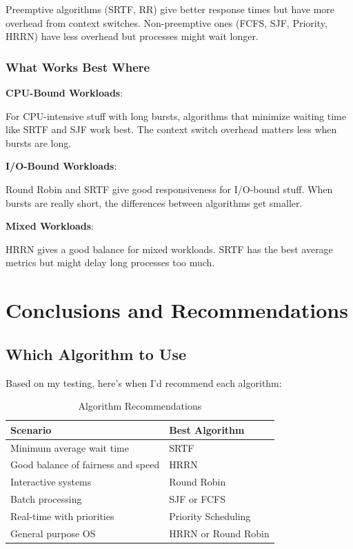\documentclass[12pt,letterpaper]{article}
\begin{document}
Preemptive algorithms (SRTF, RR) give better response times but have more 
overhead from context switches. Non-preemptive ones (FCFS, SJF, Priority, HRRN) 
have less overhead but processes might wait longer.

\subsubsection{What Works Best Where}

\textbf{CPU-Bound Workloads}:

For CPU-intensive stuff with long bursts, algorithms that minimize waiting time 
like SRTF and SJF work best. The context switch overhead matters less when 
bursts are long.

\textbf{I/O-Bound Workloads}:

Round Robin and SRTF give good responsiveness for I/O-bound stuff. When bursts 
are really short, the differences between algorithms get smaller.

\textbf{Mixed Workloads}:

HRRN gives a good balance for mixed workloads. SRTF has the best average metrics 
but might delay long processes too much.

\newpage

\section{Conclusions and Recommendations}

\subsection{Which Algorithm to Use}

Based on my testing, here's when I'd recommend each algorithm:

\begin{table}[H]
\centering
\caption{Algorithm Recommendations}
\begin{tabular}{@{}ll@{}}
\toprule
\textbf{Scenario} & \textbf{Best Algorithm} \\ \midrule
Minimum average wait time & SRTF \\
Good balance of fairness and speed & HRRN \\
Interactive systems & Round Robin \\
Batch processing & SJF or FCFS \\
Real-time with priorities & Priority Scheduling \\
General purpose OS & HRRN or Round Robin \\ \bottomrule
\end{tabular}
\end{table}
\end{document}
